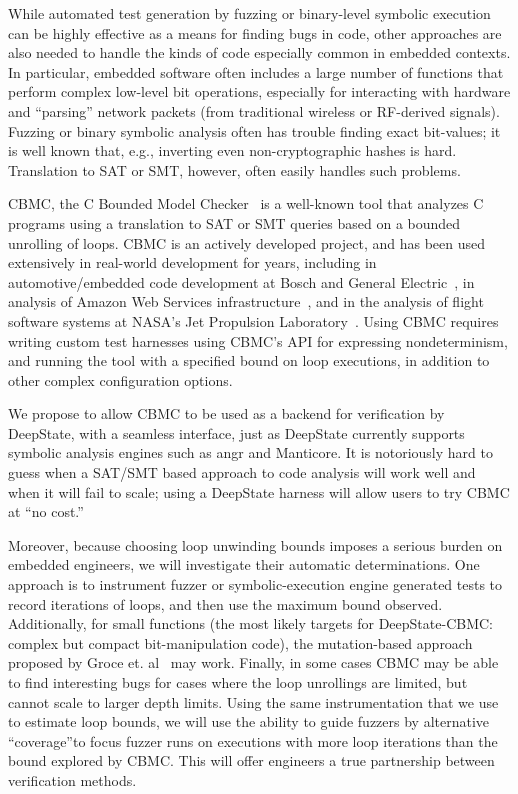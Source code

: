 While automated test generation by fuzzing or binary-level symbolic execution can be highly effective as a means for finding bugs in code, other approaches are also needed to handle the kinds of code especially common in embedded contexts.  In particular, embedded software often includes a large number of functions that perform complex low-level bit operations, especially for interacting with hardware and ``parsing'' network packets (from traditional wireless or RF-derived signals).  Fuzzing or binary symbolic analysis often has trouble  finding exact bit-values; it is well known that, e.g., inverting even non-cryptographic hashes is hard.  Translation to SAT or SMT, however, often easily handles such problems.

CBMC, the C Bounded Model Checker~\cite{cbmcp} is a well-known tool that analyzes C programs using a translation to SAT or SMT queries based on a bounded unrolling of loops. CBMC is an actively developed project, and has been used extensively in real-world development for years, including in automotive/embedded code development at Bosch and General Electric~\cite{tiemeyer2019crest}, in analysis of Amazon Web Services infrastructure~\cite{awsmodel}, and in the analysis of flight software systems at NASA's Jet Propulsion Laboratory~\cite{AMAI}.  Using CBMC requires writing custom test harnesses using CBMC's API for expressing nondeterminism, and running the tool with a specified bound on loop executions, in addition to other complex configuration options.

We propose to allow CBMC to be used as a backend for verification by DeepState, with a seamless interface, just as DeepState currently supports symbolic analysis engines such as angr and Manticore.  It is notoriously hard to guess when a SAT/SMT based approach to code analysis will work well and when it will fail to scale; using a DeepState harness will allow users to try CBMC at ``no cost.''

Moreover, because choosing loop unwinding bounds imposes a serious burden on embedded engineers, we will investigate their automatic determinations.  One approach is to instrument fuzzer or symbolic-execution engine generated tests to record iterations of loops, and then use the maximum bound observed.  Additionally, for small functions (the most likely targets for DeepState-CBMC: complex but compact bit-manipulation code), the mutation-based approach proposed by Groce et. al~\cite{groce2018verified} may work.  Finally, in some cases CBMC may be able to find interesting bugs for cases where the loop unrollings are limited, but cannot scale to larger depth limits.  Using the same instrumentation that we use to estimate loop bounds, we will use the ability to guide fuzzers by alternative ``coverage''to focus fuzzer runs on executions with more loop iterations than the bound explored by CBMC.  This will offer engineers a true partnership between verification methods. 